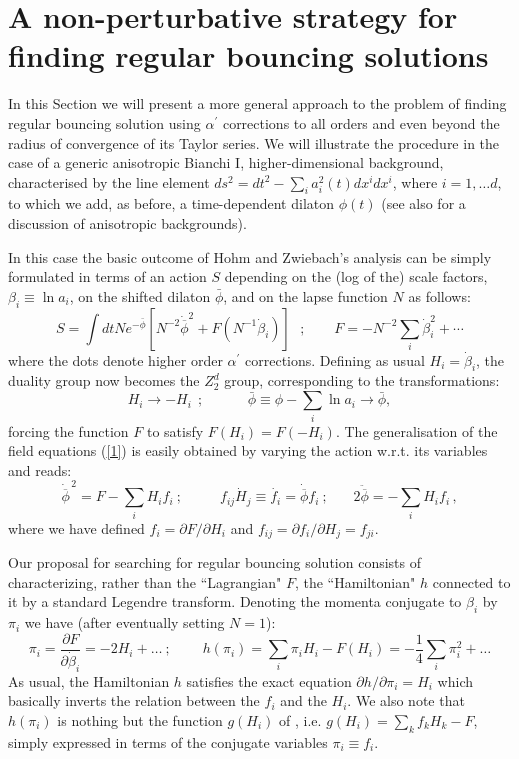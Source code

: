 \documentclass[a4paper,11pt]{article}
\def\beq{\begin{equation}}
\def\eeq{\end{equation}}
\def \pa {\partial}
\def \ap {\alpha^{\prime}}
\def \fb {\overline \phi}
\def \fbp {\dot{\fb}}
\def \fbpp {\ddot{\fb}}
\begin{document}
{%

\section{A  non-perturbative strategy for finding regular bouncing solutions}
\label{sec3}

In this Section we will present a more general approach to the problem of finding regular bouncing solution using $\ap$ corrections to all orders and even beyond the radius of convergence of its Taylor series. We will illustrate the procedure in the case of a generic anisotropic Bianchi I, higher-dimensional background, characterised by the line element 
$ds^2= dt^2 - \sum_i a_i^2 (t)  dx^idx^i $, where $i= 1, \dots d$, 
to which we add, as before, a time-dependent dilaton $ \phi(t) $ 
(see also \cite{25,26,rost,27} for a discussion of anisotropic backgrounds).



In this case the basic outcome  of Hohm and Zwiebach's analysis \cite{1}  can be simply formulated in terms of an action $S$ depending on the (log of the) scale factors, $\beta_i \equiv \ln a_i$, on the shifted dilaton $\bar{\phi}$, and on the lapse function $N$ as follows:
\beq
S= \int dt N e^{-\bar{\phi} } \left [ N^{-2} \fbp^2 + F(N^{-1} \dot{\beta}_i) \right]~~~ ;~~~~~~
~~~ F = - N^{-2} \sum_i \dot{\beta}_i^2 + \cdots 
\label{211}
\eeq
where the dots denote higher order $\ap$ corrections. 
Defining as usual $H_i = \dot{\beta}_i$, the duality group now becomes the $Z_2^d$ group, corresponding to the transformations:
\beq
 H_i \rightarrow  -H_i ~~ ; ~~~~~~~~~~~~~~
 \bar{\phi} \equiv \phi - \sum_i \ln a_i  \rightarrow \bar{\phi}, 
\label{212}
\eeq
forcing the function $F$ to satisfy $F(H_i)= F(-H_i)$. The generalisation of the field equations (\ref{1}) is easily obtained by varying the action w.r.t. its variables and reads:
\beq
{\fbp}^{\,2} = F- \sum_i H_i f_i ~;~~~~~~~~~~~~
 f_{ij}\dot{H}_j \equiv \dot{f_i} = \fbp f_i ~;~~~~~~~~  2 \fbpp = - \sum_i H_i f_i \, ,
\label{213}
\eeq
where we have defined $f_i = {\partial F}/{\partial H_i}$  and $f_{ij} = {\partial f_i/}{\partial H_j} = f_{ji}$.

Our proposal for searching for regular bouncing solution consists of characterizing, rather than the ``Lagrangian" $F$, the ``Hamiltonian" $h$ connected to it by a standard Legendre transform. Denoting the momenta conjugate to $\beta_i$ by $\pi_i$ we have (after eventually setting $N=1$):
\beq
\pi_i = \frac{\pa F}{\pa \dot{\beta}_i } = - 2 H_i + \dots  ~;
~~~~~~~~~~ h(\pi_i) = \sum_i  \pi_i H_i - F(H_i) =  -\frac14  \sum_i  \pi_i^2 + \dots
\label{214}
\eeq
As usual, the Hamiltonian $h$ satisfies the exact equation ${\pa h}/{\pa \pi_i} = H_i$ which basically inverts the relation between the $f_i$ and the $H_i$. We also note that $h(\pi_i)$ is nothing but the function $g(H_i)$ of \cite{1}, 
i.e. $g(H_i)= \sum_k f_kH_k -F$, simply expressed in terms of the conjugate variables $\pi_i \equiv f_i$.


}
\end{document}
